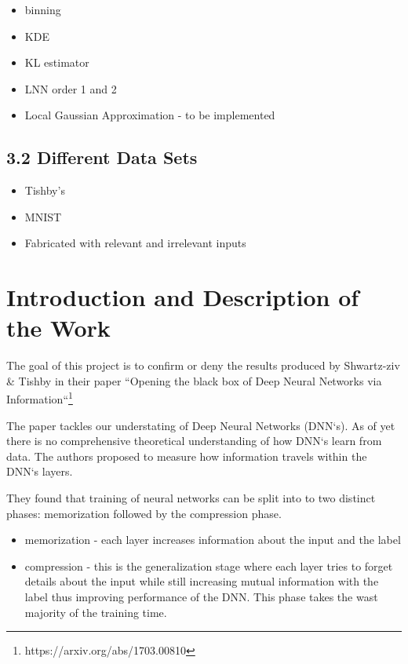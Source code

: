 \documentclass[12pt]{article}
\begin{document}
  

\begin{itemize}

  \item binning

  \item KDE 

  \item KL estimator

  \item LNN order 1 and 2

  \item Local Gaussian Approximation - to be implemented



\end{itemize} 

\subsection*{3.2 Different Data Sets}

\begin{itemize}
  \item Tishby's

  \item MNIST

  \item Fabricated with relevant and irrelevant inputs

\end{itemize}


\section*{Introduction and Description of the Work}

The goal of this project is to confirm or deny the results produced by
Shwartz-ziv \& Tishby in their paper ``Opening the black box of Deep Neural
Networks via Information``\footnote{https://arxiv.org/abs/1703.00810}

The paper tackles our understating of Deep Neural Networks (DNN`s). As of yet
there is no comprehensive theoretical understanding of how DNN`s learn from data.
The authors proposed to measure how information travels within the DNN`s layers.

They found that training of neural networks can be split into to two distinct
phases: memorization followed by the compression phase.
\begin{itemize}
  \item memorization - each layer increases information about the input and the
    label
  \item compression  - this is the generalization stage where each layer tries
    to forget details about the input while still increasing mutual information
    with the label thus improving performance of the DNN. This phase takes the
    wast majority of the training time.
\end{itemize}
\end{document}
